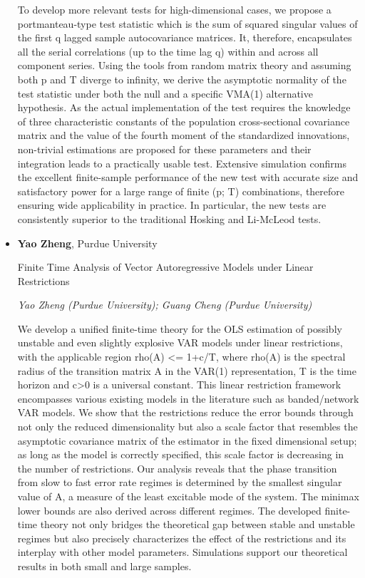 \begin{itemize}
To develop more relevant tests for high-dimensional cases, we propose a portmanteau-type test statistic which is the sum of squared singular values of the first q lagged sample autocovariance matrices. It, therefore, encapsulates all the serial correlations (up to the time lag q) within and across all component series. Using the tools from random matrix theory and assuming both p and T diverge to infinity, we derive the asymptotic normality of the test statistic under both the null and a  specific VMA(1) alternative hypothesis. As the actual implementation of the test requires the knowledge of three characteristic constants of the population cross-sectional covariance matrix and the value of the fourth moment of the standardized innovations, non-trivial estimations are proposed for these parameters and their integration leads to a practically usable test. Extensive simulation confirms the excellent finite-sample performance of the new test with accurate size and satisfactory power for a large range of finite (p; T) combinations, therefore ensuring wide applicability in practice. In particular, the new tests are consistently superior to the traditional Hosking and Li-McLeod tests.

\item \textbf{Yao Zheng}, Purdue University

Finite Time Analysis of Vector Autoregressive Models under Linear Restrictions

\emph{\footnotesize Yao Zheng (Purdue University); Guang Cheng (Purdue University)}

We develop a unified finite-time theory for the OLS estimation of possibly unstable and even slightly explosive VAR models under linear restrictions, with the applicable region rho(A) <= 1+c/T, where rho(A) is the spectral radius of the transition matrix A in the VAR(1) representation, T is the time horizon and c>0 is a universal constant. This linear restriction framework encompasses various existing models in the literature such as banded/network VAR models. We show that the restrictions reduce the error bounds through not only the reduced dimensionality but also a scale factor that resembles the asymptotic covariance matrix of the estimator in the fixed dimensional setup; as long as the model is correctly specified, this scale factor is decreasing in the number of restrictions. Our analysis reveals that the phase transition from slow to fast error rate regimes is determined by the smallest singular value of A, a measure of the least excitable mode of the system. The minimax lower bounds are also derived across different regimes. The developed finite-time theory not only bridges the theoretical gap between stable and unstable regimes but also precisely characterizes the effect of the restrictions and its interplay with other model parameters. Simulations support our theoretical results in both small and large samples.

\end{itemize}

